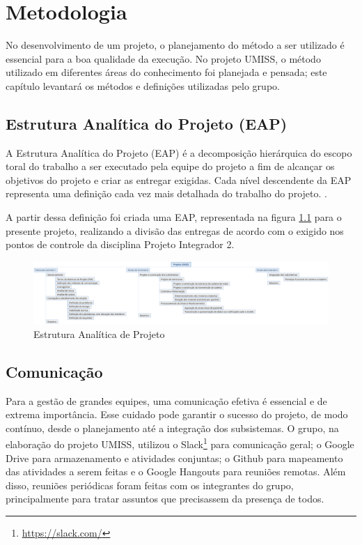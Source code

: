 \chapter{Metodologia}

No desenvolvimento de um projeto, o planejamento do método a ser utilizado
é essencial para a boa qualidade da execução. No projeto UMISS, o método
utilizado em diferentes áreas do conhecimento foi planejada e pensada;
este capítulo levantará os métodos e definições utilizadas pelo grupo.

\section{Estrutura Analítica do Projeto (EAP)}
A Estrutura Analítica do Projeto (EAP) é a decomposição hierárquica do escopo 
toral do trabalho a ser executado pela equipe do projeto a fim de alcançar
os objetivos do projeto e criar as entregar exigidas. Cada nível descendente 
da EAP representa uma definição cada vez mais detalhada do trabalho do 
projeto. \cite{pmbok}.

A partir dessa definição foi criada uma EAP, representada na figura \ref{fig:eap}
para o presente projeto, realizando 
a divisão das entregas de acordo com o exigido nos pontos de controle da 
disciplina Projeto Integrador 2.

\begin{figure}[H]
  \centering
    \includegraphics[width=\textwidth]{figuras/eap-umiss-3.eps}
  \caption{Estrutura Analítica de Projeto}
  \label{fig:eap}
\end{figure}

\section{Comunicação}

Para a gestão de grandes equipes, uma comunicação efetiva é essencial e de extrema importância.
Esse cuidado pode garantir o sucesso do projeto, de modo contínuo, desde o planejamento até
a integração dos subsistemas.
O grupo, na elaboração do projeto UMISS, utilizou o Slack\footnote{\url{https://slack.com/}}
para comunicação geral; o Google Drive para armazenamento e atividades conjuntas; o Github para mapeamento
das atividades a serem feitas e o Google Hangouts para reuniões remotas. Além disso, reuniões
periódicas foram feitas com os integrantes do grupo, principalmente para tratar assuntos
que precisassem da presença de todos.

